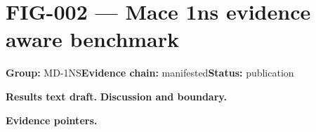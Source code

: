 \clearpage
\section{FIG-002 --- Mace 1ns evidence aware benchmark}
\label{figpage:fig-002}
\textbf{Group:} MD-1NS\quad \textbf{Evidence chain:} manifested\quad \textbf{Status:} publication

\textbf{Results text draft.} 
\textbf{Discussion and boundary.} 


\textbf{Evidence pointers.}



\vfill

